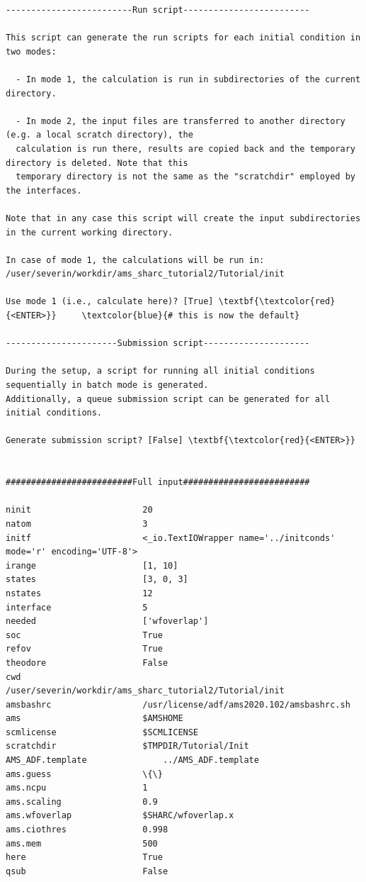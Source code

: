 \documentclass[a4paper,11pt,DIV=15,openany]{scrbook}
\begin{document}
\begin{oframed}
\begin{Verbatim}[commandchars=\\\{\}]
-------------------------Run script-------------------------

This script can generate the run scripts for each initial condition in two modes:

  - In mode 1, the calculation is run in subdirectories of the current directory.

  - In mode 2, the input files are transferred to another directory (e.g. a local scratch directory), the 
  calculation is run there, results are copied back and the temporary directory is deleted. Note that this 
  temporary directory is not the same as the "scratchdir" employed by the interfaces.

Note that in any case this script will create the input subdirectories in the current working directory.

In case of mode 1, the calculations will be run in:
/user/severin/workdir/ams_sharc_tutorial2/Tutorial/init

Use mode 1 (i.e., calculate here)? [True] \textbf{\textcolor{red}{<ENTER>}}     \textcolor{blue}{# this is now the default}

----------------------Submission script---------------------

During the setup, a script for running all initial conditions sequentially in batch mode is generated. 
Additionally, a queue submission script can be generated for all initial conditions.

Generate submission script? [False] \textbf{\textcolor{red}{<ENTER>}}


#########################Full input#########################

ninit                      20
natom                      3
initf                      <_io.TextIOWrapper name='../initconds' mode='r' encoding='UTF-8'>
irange                     [1, 10]
states                     [3, 0, 3]
nstates                    12
interface                  5
needed                     ['wfoverlap']
soc                        True
refov                      True
theodore                   False
cwd                        /user/severin/workdir/ams_sharc_tutorial2/Tutorial/init
amsbashrc                  /usr/license/adf/ams2020.102/amsbashrc.sh
ams                        $AMSHOME
scmlicense                 $SCMLICENSE
scratchdir                 $TMPDIR/Tutorial/Init
AMS_ADF.template               ../AMS_ADF.template
ams.guess                  \{\}
ams.ncpu                   1
ams.scaling                0.9
ams.wfoverlap              $SHARC/wfoverlap.x
ams.ciothres               0.998
ams.mem                    500
here                       True
qsub                       False


\end{Verbatim}
\end{oframed}
\end{document}
